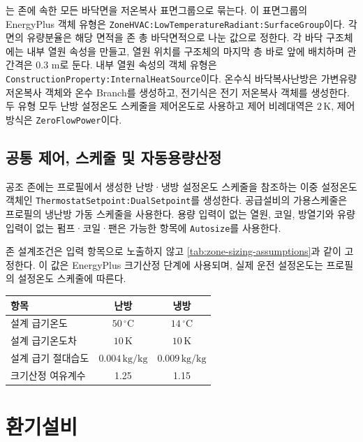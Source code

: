 는 존에 속한 모든 바닥면을 저온복사 표면그룹으로 묶는다. 이 표면그룹의 EnergyPlus 객체 유형은 \texttt{ZoneHVAC:LowTemperatureRadiant:SurfaceGroup}이다. 각 면의 유량분율은 해당 면적을 존 총 바닥면적으로 나눈 값으로 정한다. 각 바닥 구조체에는 내부 열원 속성을 만들고, 열원 위치를 구조체의 마지막 층 바로 앞에 배치하며 관 간격은 0.3 m로 둔다. 내부 열원 속성의 객체 유형은 \texttt{ConstructionProperty:InternalHeatSource}이다. 온수식 바닥복사난방은 가변유량 저온복사 객체와 온수 Branch를 생성하고, 전기식은 전기 저온복사 객체를 생성한다. 두 유형 모두 난방 설정온도 스케줄을 제어온도로 사용하고 제어 비례대역은 $2\,\mathrm{K}$, 제어방식은 \texttt{ZeroFlowPower}이다.

\subsection{공통 제어, 스케줄 및 자동용량산정}

공조 존에는 프로필에서 생성한 난방·냉방 설정온도 스케줄을 참조하는 이중 설정온도 객체인 \texttt{ThermostatSetpoint:}\allowbreak\texttt{Dual}\allowbreak\texttt{Setpoint}를 생성한다. 공급설비의 가용스케줄은 프로필의 냉난방 가동 스케줄을 사용한다. 용량 입력이 없는 열원, 코일, 방열기와 유량 입력이 없는 펌프·코일·팬은 가능한 항목에 \texttt{Autosize}를 사용한다.

존 설계조건은 입력 항목으로 노출하지 않고 \cref{tab:zone-sizing-assumptions}과 같이 고정한다. 이 값은 EnergyPlus 크기산정 단계에 사용되며, 실제 운전 설정온도는 프로필의 설정온도 스케줄에 따른다.

\begin{defaulttable}
  \caption{냉난방 존 자동용량산정의 고정 설계조건}
  \label{tab:zone-sizing-assumptions}
  \begin{tabular}{lcc}
    \toprule
    항목 & 난방 & 냉방 \\ \midrule
    설계 급기온도 & $50\,^{\circ}\mathrm{C}$ & $14\,^{\circ}\mathrm{C}$ \\
    설계 급기온도차 & $10\,\mathrm{K}$ & $10\,\mathrm{K}$ \\
    설계 급기 절대습도 & $0.004\,\mathrm{kg/kg}$ & $0.009\,\mathrm{kg/kg}$ \\
    크기산정 여유계수 & 1.25 & 1.15 \\ \bottomrule
  \end{tabular}
\end{defaulttable}

\section{환기설비}
\label{section:ventilation-conversion}


